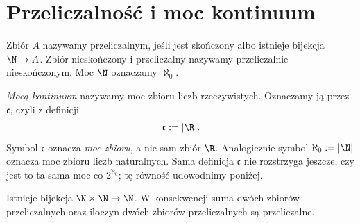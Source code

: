 \section{Przeliczalność i moc kontinuum}
\begin{definicja}\label{def:card-countable}
Zbiór $A$ nazywamy przeliczalnym, jeśli jest skończony albo istnieje bijekcja $\N\to A$. Zbiór nieskończony i przeliczalny nazywamy przeliczalnie nieskończonym. Moc $\N$ oznaczamy $\aleph_0$.
\end{definicja}
\begin{definicja}\label{def:card-continuum}
\emph{Mocą kontinuum} nazywamy moc zbioru liczb rzeczywistych. Oznaczamy ją
przez $\mathfrak c$, czyli z definicji
\[
  \mathfrak c:=|\R|.
\]
Symbol $\mathfrak c$ oznacza \emph{moc zbioru}, a nie sam zbiór $\R$.
Analogicznie symbol $\aleph_0:=|\N|$ oznacza moc zbioru liczb naturalnych.
Sama definicja $\mathfrak c$ nie rozstrzyga jeszcze, czy jest to ta sama
moc co $2^{\aleph_0}$; tę równość udowodnimy poniżej.
\end{definicja}
\begin{twierdzenie}\label{thm:card-n2}
Istnieje bijekcja $\N\times\N\to\N$. W konsekwencji suma dwóch zbiorów przeliczalnych oraz iloczyn dwóch zbiorów przeliczalnych są przeliczalne.
\end{twierdzenie}
